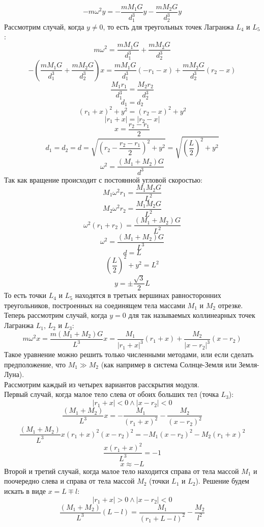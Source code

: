 \documentclass{article}
\begin{document}
    \[ - m \omega^2 y =
       -\frac{mM_1G}{d_1^3} y - \frac{mM_2G}{d_2^3} y \]
    Рассмотрим случай, когда $y \ne 0$, то есть для треугольных точек Лагранжа $L_4$ и $L_5$:
    \[ m \omega^2 =
       \frac{mM_1G}{d_1^3} + \frac{mM_2G}{d_2^3} \]
    \[ - \left( \frac{mM_1G}{d_1^3} + \frac{mM_2G}{d_2^3} \right) x =
       \frac{mM_1G}{d_1^3} (-r_1 - x) + \frac{mM_2G}{d_2^3} (r_2 - x) \]
    \[ \frac{M_1 r_1}{d_1^3} = \frac{M_2 r_2}{d_2^3} \]
    \[ d_1 = d_2 \]
    \[ (r_1 + x)^2 + y^2 = (r_2 - x)^2 + y^2\]
    \[ |r_1 + x| = |r_2 - x| \]
    \[ x = \frac{r_2 - r_1}{2} \]
    \[ d_1 = d_2 = d = \sqrt{ \left(r_2 - \frac{r_2 - r_1}{2}\right)^2 + y^2} = \sqrt{ \left(\frac{L}{2}\right)^2 + y^2 }\]  
    \[ \omega^2 = \frac{(M_1 + M_2)G}{d^3} \]
    Так как вращение происходит с постоянной угловой скоростью:
    \[ M_1 \omega^2 r_1 = \frac{M_1M_2G}{L^2} \]
    \[ M_2 \omega^2 r_2 = \frac{M_1M_2G}{L^2} \]
    \[ \omega^2 (r_1 + r_2) = \frac{\left(M_1 + M_2\right)G}{L^2} \]
    \[ \omega^2 = \frac{(M_1 + M_2)G}{L^3} \]
    \[ d = L \]
    \[ \left(\frac{L}{2}\right)^2 + y^2 = L^2 \]
    \[ y = \pm \frac{\sqrt{3}}{2}L \]
    То есть точки $L_4$ и $L_5$ находятся в третьих вершинах равносторонних треугольников, построенных на соединящем тела массами $M_1$ и $M_2$ отрезке.
    \\
    Теперь рассмотрим случай, когда $y = 0$ для так называемых коллинеарных точек Лагранжа $L_1$, $L_2$ и $L_3$:
    \[ m \omega^2 x = \frac{ m\left( M_1 + M_2 \right)G }{L^3} x =
       \frac{M_1}{|r_1 + x|^3} (r_1 + x) + \frac{M_2}{|x - r_2|^3} (x - r_2) \]
    Такое уравнение можно решить только численными методами, или если сделать предположение, что $M_1 \gg M_2$ (как например в система Солнце-Земля
    или Земля-Луна).
    \\
    Рассмотрим каждый из четырех вариантов расскрытия модуля.
    \\
    Первый случай, когда малое тело слева от обоих больших тел (точка $L_3$):
    \[ |r_1 + x| < 0 \land |x - r_2| < 0 \]
    \[ \frac{\left( M_1 + M_2 \right) }{L^3} x =
       -\frac{M_1}{(r_1 + x)^2} - \frac{M_2}{(x - r_2)^2} \]
    \[ \frac{\left( M_1 + M_2 \right) }{L^3} x (r_1 + x)^2 (x - r_2)^2 =
       - M_1 (x - r_2)^2 - M_2 (r_1 + x)^2 \]
    \[ \frac{x(r_1 + x)^2}{L^3} = -1 \]
    \[ x \approx -L \]
    Второй и третий случай, когда малое тело находится справа от тела массой $M_1$ и поочередно слева и справа от тела массой $M_2$ (точки $L_1$ и $L_2$).
    Решение будем искать в виде $x = L \mp l$:
    \[ |r_1 + x| > 0 \land |x - r_2| < 0 \]
    \[ \frac{\left( M_1 + M_2 \right) }{L^3} (L - l) =
       \frac{M_1}{(r_1 + L - l)^2} - \frac{M_2}{l^2} \]
\end{document}
